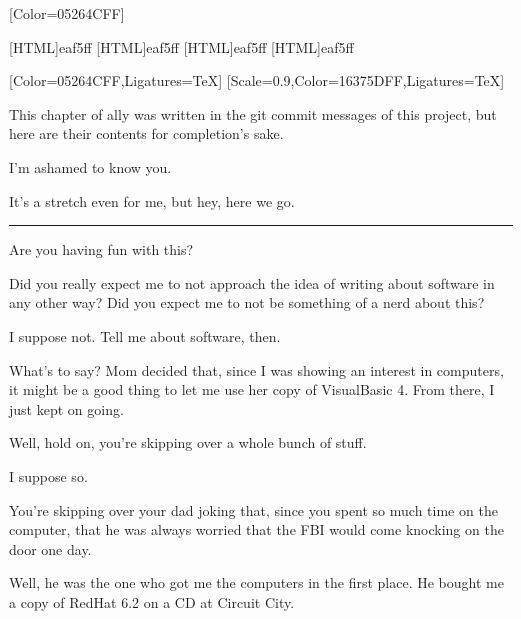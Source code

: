 \label{writing:software}
\renewfontfamily{}[Color=05264CFF]

[HTML]{eaf5ff}
[HTML]{eaf5ff}
[HTML]{eaf5ff}
[HTML]{eaf5ff}
\begin{paracol}{2}
\begin{leftcolumn}

[Color=05264CFF,Ligatures=TeX]
\renewfontfamily{}[Scale=0.9,Color=16375DFF,Ligatures=TeX]

\noindent This chapter of ally was written in the git commit messages of this project, but here are their contents for completion's sake.

\begin{ally}
I'm ashamed to know you.
\end{ally}
It's a stretch even for me, but hey, here we go.

\begin{center}
\rule{1in}{0.1pt}
\end{center}

\begin{ally}
Are you having fun with this?
\end{ally}
Did you really expect me to not approach the idea of writing about software in any other way? Did you expect me to not be something of a nerd about this?

\begin{ally}
I suppose not. Tell me about software, then.
\end{ally}
What's to say? Mom decided that, since I was showing an interest in computers, it might be a good thing to let me use her copy of VisualBasic 4. From there, I just kept on going.

\begin{ally}
Well, hold on, you're skipping over a whole bunch of stuff.
\end{ally}
I suppose so.

\begin{ally}
You're skipping over your dad joking that, since you spent so much time on the computer, that he was always worried that the FBI would come knocking on the door one day.
\end{ally}
Well, he was the one who got me the computers in the first place. He bought me a copy of RedHat 6.2 on a CD at Circuit City.


\end{leftcolumn}
\end{paracol}

